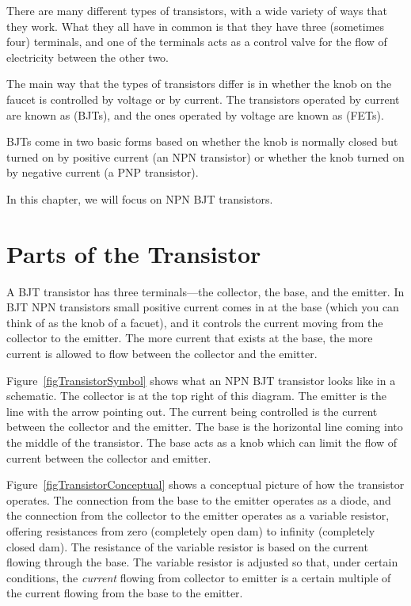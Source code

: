 There are many different types of transistors, with a wide variety of ways that they work.
What they all have in common is that they have three (sometimes four) terminals, and one of the terminals acts as a control valve for the flow of electricity between the other two.

The main way that the types of transistors differ is in whether the knob on the faucet is controlled by voltage or by current.
The transistors operated by current are known as  (BJTs), and the ones operated by voltage are known as  (FETs).

BJTs come in two basic forms based on whether the knob is normally closed but turned on by positive current (an NPN transistor) or whether the knob turned on by negative current (a PNP transistor).

In this chapter, we will focus on NPN BJT transistors.

\section{Parts of the Transistor}


A BJT transistor has three terminals---the collector, the base, and the emitter.
In BJT NPN transistors small positive current comes in at the base (which you can think of as the knob of a facuet), and it controls the current moving from the collector to the emitter.
The more current that exists at the base, the more current is allowed to flow between the collector and the emitter.

Figure~\ref{figTransistorSymbol} shows what an NPN BJT transistor looks like in a schematic.
The collector is at the top right of this diagram.  
The emitter is the line with the arrow pointing out.
The current being controlled is the current between the collector and the emitter.
The base is the horizontal line coming into the middle of the transistor.
The base acts as a knob which can limit the flow of current between the collector and emitter.

Figure~\ref{figTransistorConceptual} shows a conceptual picture of how the transistor operates.
The connection from the base to the emitter operates as a diode, and the connection from the collector to the emitter operates as a variable resistor, offering resistances from zero (completely open dam) to infinity (completely closed dam).
The resistance of the variable resistor is based on the current flowing through the base.
The variable resistor is adjusted so that, under certain conditions, the \emph{current} flowing from collector to emitter is a certain multiple of the current flowing from the base to the emitter.

